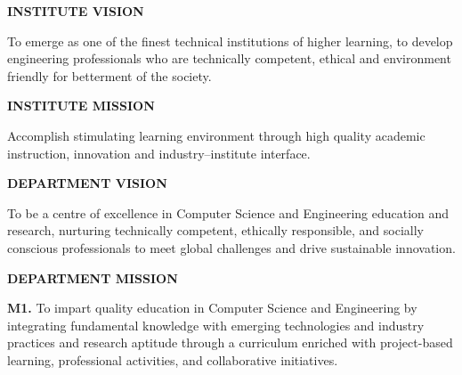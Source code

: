 \thispagestyle{empty}

\begin{center}
\begin{minipage}{0.92\textwidth}
\small

\vspace{0.25cm}

\begin{center}
{\large\bfseries\textcolor{cyan!70!blue}{INSTITUTE VISION}}
\end{center}

To emerge as one of the finest technical institutions of higher learning,
to develop engineering professionals who are technically competent,
ethical and environment friendly for betterment of the society.

\vspace{0.25cm}

\begin{center}
{\large\bfseries\textcolor{cyan!70!blue}{INSTITUTE MISSION}}
\end{center}

Accomplish stimulating learning environment through high quality
academic instruction, innovation and industry--institute interface.

\vspace{0.25cm}

\begin{center}
{\large\bfseries\textcolor{cyan!70!blue}{DEPARTMENT VISION}}
\end{center}

To be a centre of excellence in Computer Science and Engineering
education and research, nurturing technically competent, ethically
responsible, and socially conscious professionals to meet global
challenges and drive sustainable innovation.

\vspace{0.25cm}

\begin{center}
{\large\bfseries\textcolor{cyan!70!blue}{DEPARTMENT MISSION}}
\end{center}

\textbf{M1.}
To impart quality education in Computer Science and Engineering by
integrating fundamental knowledge with emerging technologies and
industry practices and research aptitude through a curriculum enriched
with project-based learning, professional activities, and collaborative
initiatives.

\vspace{0.12cm}


\end{minipage}
\end{center}
